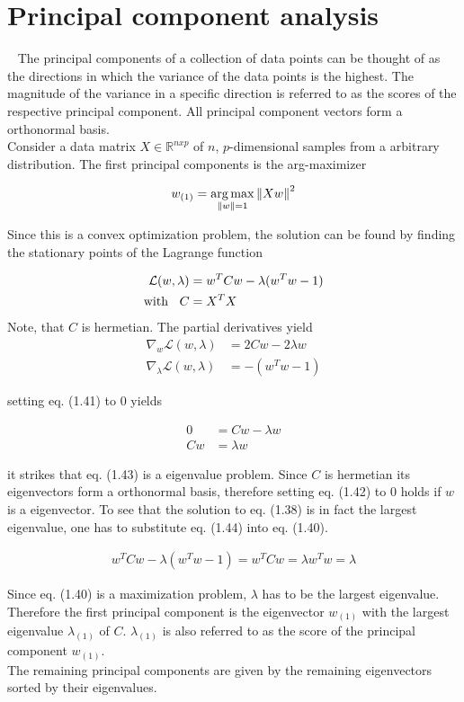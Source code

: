 \section{Principal component analysis}~\label{sec:pca}
The principal components of a collection of data points can be thought of as the directions in which the variance of the data points is the highest. The magnitude of the variance in a specific direction is referred to as the scores of the respective principal component. All principal component vectors form a orthonormal basis.\\
Consider a data matrix $X \in \mathbb{R}^{nxp}$ of $n$, $p$-dimensional samples from a arbitrary distribution. The first principal components is the arg-maximizer

\begin{align}
	w_{(1)} = \operatorname*{arg\,max}_{\left\lVert w\right\rVert = 1} \left\lVert Xw\right\rVert^2
\end{align}

Since this is a convex optimization problem, the solution can be found by finding the stationary points of the Lagrange function

\begin{align}
	\mathcal{L}(w, \lambda) &= w^TCw - \lambda(w^Tw -1) \\
	\text{with \hspace{2mm}} C &= X^TX
\end{align}
Note, that $C$ is hermetian.
The partial derivatives yield	
\begin{align}
	\nabla_w \mathcal{L}(w, \lambda) &= 2Cw-2\lambda w \\
	\nabla_\lambda \mathcal{L}(w, \lambda) &= - (w^Tw -1)
\end{align}

setting eq. (1.41) to $0$ yields

\begin{align}
	0 &= Cw-\lambda w \\
	Cw &= \lambda w
\end{align}

it strikes that eq. (1.43) is a eigenvalue problem. Since $C$ is hermetian its eigenvectors form a orthonormal basis, therefore setting eq. (1.42) to $0$ holds if $w$ is a eigenvector. To see that the solution to eq. (1.38) is in fact the largest eigenvalue, one has to substitute eq. (1.44) into eq. (1.40).

\begin{align}
	w^TCw - \lambda(w^Tw -1) = w^TCw = \lambda w^Tw = \lambda
\end{align}

Since eq. (1.40) is a maximization problem, $\lambda$ has to be the largest eigenvalue.
Therefore the first principal component is the eigenvector $w_{(1)}$ with the largest eigenvalue $\lambda_{(1)}$ of $C$. $\lambda_{(1)}$ is also referred to as the score of the principal component $w_{(1)}$. \\

The remaining principal components are given by the remaining eigenvectors sorted by their eigenvalues.
